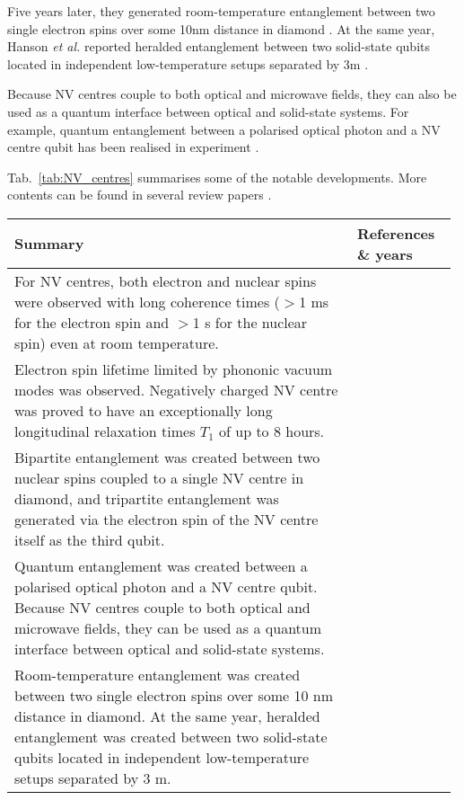 Five years later, they generated room-temperature entanglement between two single electron spins over some 10nm distance in diamond \cite{bib:dolde2013room}. At the same year, Hanson \textit{et al.} reported heralded entanglement between two solid-state qubits located in independent low-temperature setups separated by 3m \cite{bib:bernien2013heralded}.

Because NV centres couple to both optical and microwave fields, they can also be used as a quantum interface between optical and solid-state systems. For example, quantum entanglement between a polarised optical photon and a NV centre qubit has been realised in experiment \cite{bib:togan2010quantum}.

Tab.~\ref{tab:NV_centres} summarises some of the notable developments. More contents can be found in several review papers \cite{bib:doherty2013nitrogen, bib:atature2018material, bib:awschalom2018quantum}.

\begin{table*}[!htbp]
	\begin{tabular}{|p{0.755\linewidth}|p{0.22\linewidth}|}
		\hline
		Summary & References \& years \\
		\hline \hline
		For NV centres, both electron and nuclear spins were observed with long coherence times ($>$1 ms for the electron spin and $>$1 s for the nuclear spin) even at room temperature. &  \cite{bib:balasubramanian2009ultralong, bib:neumann2010quantum, bib:maurer2012room} \\
		\hline
		Electron spin lifetime limited by phononic vacuum modes was observed. Negatively charged NV centre was proved to have an exceptionally long longitudinal relaxation times $T_1$\index{T$_1$-time} of up to 8 hours. & \cite{bib:astner2018solid} \\
		\hline
		Bipartite entanglement was created between two nuclear spins coupled to a single NV centre in diamond, and tripartite entanglement was generated via the electron spin of the NV centre itself as the third qubit. & \cite{bib:neumann2008multipartite} \\
		\hline
		Quantum entanglement was created between a polarised optical photon and a NV centre qubit. Because NV centres couple to both optical and microwave fields, they can be used as a quantum interface between optical and solid-state systems.  & \cite{bib:togan2010quantum}\\
		\hline
		Room-temperature entanglement was created between two single electron spins over some 10 nm distance in diamond. At the same year, heralded entanglement was created between two solid-state qubits located in independent low-temperature setups separated by 3 m. & \cite{bib:dolde2013room, bib:bernien2013heralded} \\
		\hline
	\end{tabular}
	\captionspacetab \caption{Some of the notable developments in nitrogen-vacancy (NV) centres} \label{tab:NV_centres}
\end{table*}

